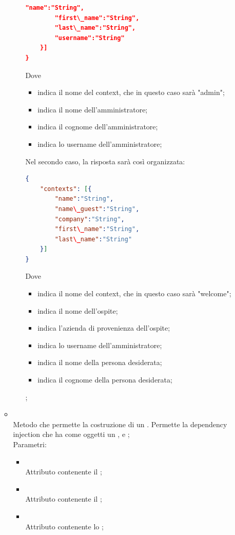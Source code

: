 \begin{itemize}
\begin{itemize}
\begin{itemize}
\begin{lstlisting}[language=json,firstnumber=1]
        "name":"String",
        "first\_name":"String",
        "last\_name":"String",
        "username":"String"
    }]
}
\end{lstlisting}
Dove
\begin{itemize}
    \item {} indica il nome del context, che in questo caso sarà "admin";
    \item {} indica il nome dell'amministratore;
    \item {} indica il cognome dell'amministratore;
    \item {} indica lo username dell'amministratore;
\end{itemize}
Nel secondo caso, la risposta sarà così organizzata:
\begin{lstlisting}[language=json,firstnumber=1]
{
    "contexts": [{
        "name":"String",
        "name\_guest":"String",
        "company":"String",
        "first\_name":"String",
        "last\_name":"String"
    }]
}
\end{lstlisting}
Dove
\begin{itemize}
    \item {} indica il nome del context, che in questo caso sarà "welcome";
    \item {} indica il nome dell'ospite;
    \item {} indica l'azienda di provenienza dell'ospite;
    \item {} indica lo username dell'amministratore;
    \item {} indica il nome della persona desiderata;
    \item {} indica il cognome della persona desiderata;
\end{itemize};
		\end{itemize}
		\item[]  \\
		Metodo che permette la costruzione di un . Permette la dependency injection che ha come oggetti un ,  e ;\\
		Parametri:
		\begin{itemize}
			\item {} \\
			Attributo contenente il  ;
			\item {} \\
			Attributo contenente il ;
			\item {} \\
			Attributo contenente lo ;
		\end{itemize}
	\end{itemize}
\end{itemize}
\FloatBarrier

